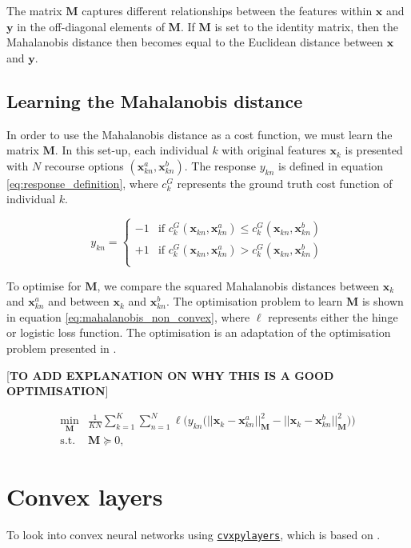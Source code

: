 The matrix $\mathbf{M}$ captures different relationships between the features within $\mathbf{x}$ and $\mathbf{y}$ in the off-diagonal elements of $\mathbf{M}$. If $\mathbf{M}$ is set to the identity matrix, then the Mahalanobis distance then becomes equal to the Euclidean distance between $\mathbf{x}$ and $\mathbf{y}$. \\

\subsection{Learning the Mahalanobis distance}

In order to use the Mahalanobis distance as a cost function, we must learn the matrix $\mathbf{M}$. In this set-up, each individual $k$ with original features $\mathbf{x}_k$ is presented with $N$ recourse options $(\mathbf{x}_{kn}^a, \mathbf{x}_{kn}^b)$. The response $y_{kn}$ is defined in equation \ref{eq:response_definition}, where $c^G_k$ represents the ground truth cost function of individual $k$.

\begin{equation} \label{eq:response_definition}
	y_{kn} = \begin{cases}
		-1 & \text{if } c^G_k(\mathbf{x}_{kn}, \mathbf{x}^a_{kn}) \leq c^G_k(\mathbf{x}_{kn}, \mathbf{x}^b_{kn}) \\
		+1 & \text{if } c^G_k(\mathbf{x}_{kn}, \mathbf{x}^a_{kn}) > c^G_k(\mathbf{x}_{kn}, \mathbf{x}^b_{kn}) \\
	\end{cases}
\end{equation}

To optimise for $\textbf{M}$, we compare the squared Mahalanobis distances between $\textbf{x}_k$ and $\textbf{x}^a_{kn}$ and between $\textbf{x}_k$ and $\textbf{x}^b_{kn}$. The optimisation problem to learn $\textbf{M}$ is shown in equation \ref{eq:mahalanobis_non_convex}, where $\ell$ represents either the hinge or logistic loss function. The optimisation is an adaptation of the optimisation problem presented in \textcite{canalOneAllSimultaneous2022}.

[\textbf{TO ADD EXPLANATION ON WHY THIS IS A GOOD OPTIMISATION}]

\begin{align} \label{eq:mahalanobis_non_convex}
	\min_{\mathbf{M}} & \frac{1}{KN} \sum_{k=1}^K \sum_{n=1}^N \ell \bigg( y_{kn} \big(|| \mathbf{x}_k - \mathbf{x}_{kn}^a ||^2_{\mathbf{M}} - || \mathbf{x}_k - \mathbf{x}_{kn}^b ||^2_{\mathbf{M}} \big) \bigg) \\	
	\text{s.t. } & \mathbf{M} \succeq 0, \nonumber
\end{align}

\section{Convex layers}

To look into convex neural networks using \href{https://github.com/cvxgrp/cvxpylayers}{\texttt{cvxpylayers}}, which is based on \textcite{agrawalDifferentiableConvexOptimization2019}.
